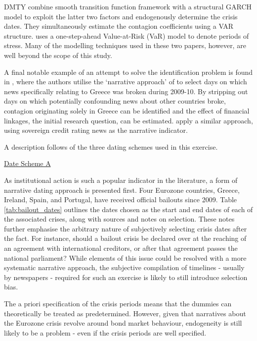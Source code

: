 \documentclass[../base.tex]{subfiles}
\begin{document}
DMTY combine smooth transition function framework with a structural GARCH model to exploit the latter two factors and endogenously determine the crisis dates. They simultaneously estimate the contagion coefficients using a VAR structure. \cite{metiu2012sovereign} uses a one-step-ahead Value-at-Risk (VaR) model to denote periods of stress. Many of the modelling techniques used in these two papers, however, are well beyond the scope of this study.

A final notable example of an attempt to solve the identification problem is found in \cite{brutti2012transmission}, where the authors utilise the `narrative approach' of \cite{romer1989does} to select days on which news specifically relating to Greece was broken during 2009-10. By stripping out days on which potentially confounding news about other countries broke, contagion originating solely in Greece can be identified and the effect of financial linkages, the initial research question, can be estimated. \cite{arezki2011sovereign} apply a similar approach, using sovereign credit rating news as the narrative indicator. 




A description follows of the three dating schemes used in this exercise.

\underline{Date Scheme A}

As institutional action is such a popular indicator in the literature, a form of narrative dating approach is presented first. Four Eurozone countries, Greece, Ireland, Spain, and Portugal, have received official bailouts since 2009. Table \ref{tab:bailout_dates} outlines the dates chosen as the start and end dates of each of the associated crises, along with sources and notes on selection. These notes further emphasise the arbitrary nature of subjectively selecting crisis dates after the fact. For instance, should a bailout crisis be declared over at the reaching of an agreement with international creditors, or after that agreement passes the national parliament? While elements of this issue could be resolved with a more systematic narrative approach, the subjective compilation of timelines - usually by newspapers - required for such an exercise is likely to still introduce selection bias. 

The a priori specification of the crisis periods means that the dummies can theoretically be treated as predetermined. However, given that narratives about the Eurozone crisis revolve around bond market behaviour, endogeneity is still likely to be a problem - even if the crisis periods are well specified.
\end{document}

